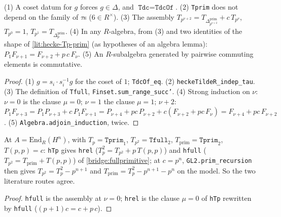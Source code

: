 \begin{lemma}\label{lem:m4-relations-aux}
  \leanok
  (1) A coset datum for $g$ forces $g\in\Delta$, and $\texttt{Tdc}=\texttt{TdcOf}$. (2) \texttt{Tprim} does not depend on the family
  of $\tau$s ($6\in R^\times$). (3) The assembly $T_{p^{\nu+2}}=T_{\Delta^{\mathrm{prim}}_{p^{\nu+2}}}+c\,T_{p^\nu}$,
  $T_{p^0}=1$, $T_{p^1}=T_{\Delta^{\mathrm{prim}}_p}$. (4) In any $R$-algebra, from (3) and two identities of the shape of
  \ref{lit:hecke-Tp-prim} (as hypotheses of an algebra lemma): $P_1F_{\nu+1}=F_{\nu+2}+p\,c\,F_\nu$. (5) An $R$-subalgebra
  generated by pairwise commuting elements is commutative.
\end{lemma}
\begin{proof}
  \leanok
  (1) $g=s_i\cdot s_i^{-1}g$ for the coset of $1$; \texttt{TdcOf\_eq}. (2) \texttt{heckeTildeR\_indep\_tau}. (3) The definition of
  \texttt{Tfull}, \texttt{Finset.sum\_range\_succ'}. (4) Strong induction on $\nu$: $\nu=0$ is the clause $\mu=0$; $\nu=1$ the clause
  $\mu=1$; $\nu+2$: $P_1F_{\nu+3}=P_1P_{\nu+3}+c\,P_1F_{\nu+1}=P_{\nu+4}+pc\,P_{\nu+2}+c(F_{\nu+2}+pc\,F_\nu)
  =F_{\nu+4}+pc\,F_{\nu+2}$. (5) \texttt{Algebra.adjoin\_induction}, twice.
\end{proof}

\begin{lemma}\label{lem:m4-hTp-hrel}
  \leanok
  At $A=\mathrm{End}_R(H^n)$, with $T_p=\mathtt{Tprim}_1$, $T_{p^2}=\mathtt{Tfull}_2$, $T_{\mathrm{prim}}=\mathtt{Tprim}_2$,
  $T(p,p)=c$: \texttt{hTp} gives \texttt{hrel} ($T_p^2=T_{p^2}+p\,T(p,p)$) and \texttt{hfull} ($T_{p^2}=T_{\mathrm{prim}}+T(p,p)$) of
  \ref{bridge:fullprimitive}; at $c=p^n$, \texttt{GL2.prim\_recursion} then gives $T_{p^2}=T_p^2-p^{n+1}$ and
  $T_{\mathrm{prim}}=T_p^2-p^{n+1}-p^n$ on the model. So the two literature routes agree.
\end{lemma}
\begin{proof}
  \leanok
  \texttt{hfull} is the assembly at $\nu=0$; \texttt{hrel} is the clause $\mu=0$ of \texttt{hTp} rewritten by \texttt{hfull}
  ($(p+1)c=c+p\,c$).
\end{proof}

